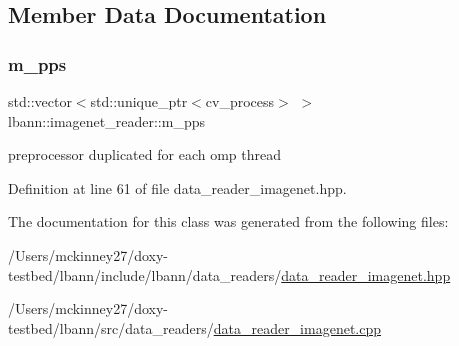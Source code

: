 \subsection{Member Data Documentation}
\mbox{\label{classlbann_1_1imagenet__reader_a1e0d0ed4ac529de3e9f735512f5e3dd8}} 
\subsubsection{\texorpdfstring{m\+\_\+pps}{m\_pps}}
{\footnotesize\ttfamily std\+::vector$<$std\+::unique\+\_\+ptr$<$cv\+\_\+process$>$ $>$ lbann\+::imagenet\+\_\+reader\+::m\+\_\+pps\hspace{0.3cm}{\ttfamily [protected]}}



preprocessor duplicated for each omp thread 



Definition at line 61 of file data\+\_\+reader\+\_\+imagenet.\+hpp.



The documentation for this class was generated from the following files\+:\begin{DoxyCompactItemize}
\item 
/\+Users/mckinney27/doxy-\/testbed/lbann/include/lbann/data\+\_\+readers/\hyperlink{data__reader__imagenet_8hpp}{data\+\_\+reader\+\_\+imagenet.\+hpp}\item 
/\+Users/mckinney27/doxy-\/testbed/lbann/src/data\+\_\+readers/\hyperlink{data__reader__imagenet_8cpp}{data\+\_\+reader\+\_\+imagenet.\+cpp}\end{DoxyCompactItemize}
